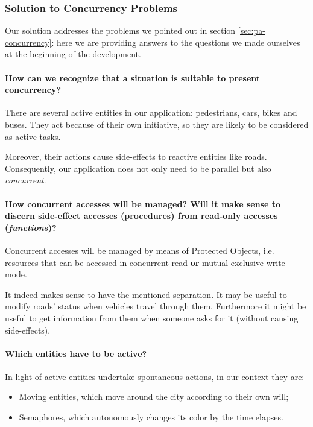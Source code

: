 \subsubsection{Solution to Concurrency Problems}

Our solution addresses the problems we pointed out in section
\ref{sec:pa-concurrency}: here we are providing answers to the questions we
made ourselves at the beginning of the development.

\paragraph{How can we recognize that a situation is suitable to present
concurrency?} There are several active entities in our application: pedestrians,
cars, bikes and buses. They act because of their own initiative, so they are
likely to be considered as active tasks.

Moreover, their actions cause side-effects to reactive entities like roads.
Consequently, our application does not only need to be parallel 
but also \textit{concurrent}.

\paragraph{How concurrent accesses will be managed? Will it make sense to
discern side-effect accesses (procedures) from read-only accesses
(\textit{functions})?} Concurrent accesses will be managed by means of
Protected Objects, i.e. resources that can be accessed in concurrent read
\textbf{or} mutual exclusive write mode.

It indeed makes sense to have the mentioned separation. 
It may be useful to modify roads' status when vehicles travel through them. 
Furthermore it might be useful to get information from them 
when someone asks for it (without causing side-effects).

\paragraph{Which entities have to be active?} 
In light of active entities undertake spontaneous actions, in our context they are:
\begin{itemize}
  \item Moving entities, which move around the city according to their own will;
  \item Semaphores, which autonomously changes its color by the time elapses.
\end{itemize}


